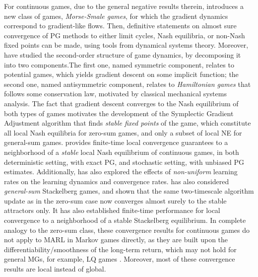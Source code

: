  

 
 \vspace{6pt}
\vspace{3pt} 
  
For continuous games, 
due to the general negative  results  therein,  \cite{mazumdar2018convergence} introduces  a new class of games, \emph{Morse-Smale games}, for which the gradient dynamics correspond to gradient-like flows. Then, definitive statements on  almost sure convergence of PG methods  to either limit cycles, Nash equilibria, or non-Nash fixed points can be made, using tools from  dynamical systems theory.  
  Moreover,  \cite{balduzzi2018mechanics,letcher2019differentiable} have studied   the second-order structure of game dynamics, by decomposing  it into two components.The first one, named symmetric component,  relates to potential games, which yields gradient descent on some implicit function; the second one, named antisymmetric component, relates  to  \emph{Hamiltonian games} that follows some conservation law,  motivated by classical mechanical systems analysis. The fact that gradient descent converges to the Nash equilibrium of both types of games motivates the development of  the Symplectic Gradient Adjustment  algorithm that finds  \emph{stable fixed points} of the game, which constitute all local Nash equilibria for zero-sum games, and only 
  a subset of local NE for general-sum games. 
\cite{chasnov2019convergence} provides finite-time local convergence guarantees to  a neighborhood of a \emph{stable} local Nash equilibrium of continuous games, in both deterministic setting, with exact PG, and stochastic setting, with unbiased PG estimates. Additionally, \cite{chasnov2019convergence} has also explored the effects of \emph{non-uniform} learning rates on the learning dynamics and convergence rates. 
\cite{fiez2019convergence} has also considered \emph{general-sum} Stackelberg games, and shown that the same  two-timescale algorithm update as in the zero-sum case now converges almost surely to  the stable attractors only. It has also established  finite-time performance  for local convergence to a neighborhood of a stable Stackelberg equilibrium.  
In complete analogy to the zero-sum class, these convergence results for continuous games do not apply to MARL in Markov games directly, as they are  built upon the differentiability/smoothness of the long-term return, which may not hold for  general MGs, for example, LQ games \cite{mazumdar2019policy}.  Moreover, most of these convergence results are local instead of global. 
 
